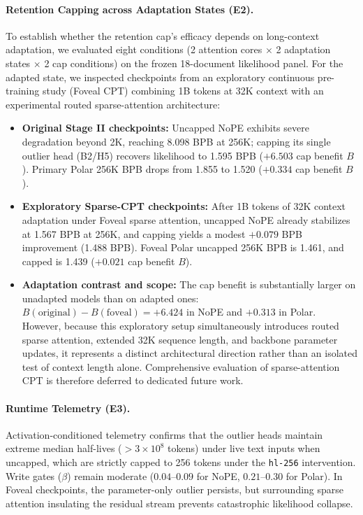\paragraph{Retention Capping across Adaptation States (E2).}
To establish whether the retention cap's efficacy depends on long-context adaptation, we evaluated eight conditions (2 attention cores $\times$ 2 adaptation states $\times$ 2 cap conditions) on the frozen 18-document likelihood panel. For the adapted state, we inspected checkpoints from an exploratory continuous pre-training study (Foveal CPT) combining 1B tokens at 32K context with an experimental routed sparse-attention architecture:
\begin{itemize}
  \item \textbf{Original Stage II checkpoints:} Uncapped NoPE exhibits severe degradation beyond 2K, reaching 8.098 BPB at 256K; capping its single outlier head (B2/H5) recovers likelihood to 1.595 BPB ($+6.503$ cap benefit $B$). Primary Polar 256K BPB drops from 1.855 to 1.520 ($+0.334$ cap benefit $B$).
  \item \textbf{Exploratory Sparse-CPT checkpoints:} After 1B tokens of 32K context adaptation under Foveal sparse attention, uncapped NoPE already stabilizes at 1.567 BPB at 256K, and capping yields a modest $+0.079$ BPB improvement (1.488 BPB). Foveal Polar uncapped 256K BPB is 1.461, and capped is 1.439 ($+0.021$ cap benefit $B$).
  \item \textbf{Adaptation contrast and scope:} The cap benefit is substantially larger on unadapted models than on adapted ones: $B(\text{original}) - B(\text{foveal}) = +6.424$ in NoPE and $+0.313$ in Polar. However, because this exploratory setup simultaneously introduces routed sparse attention, extended 32K sequence length, and backbone parameter updates, it represents a distinct architectural direction rather than an isolated test of context length alone. Comprehensive evaluation of sparse-attention CPT is therefore deferred to dedicated future work.
\end{itemize}

\paragraph{Runtime Telemetry (E3).}
Activation-conditioned telemetry confirms that the outlier heads maintain extreme median half-lives ($>3 \times 10^8$ tokens) under live text inputs when uncapped, which are strictly capped to 256 tokens under the \texttt{hl-256} intervention. Write gates ($\beta$) remain moderate ($0.04$--$0.09$ for NoPE, $0.21$--$0.30$ for Polar). In Foveal checkpoints, the parameter-only outlier persists, but surrounding sparse attention insulating the residual stream prevents catastrophic likelihood collapse.

